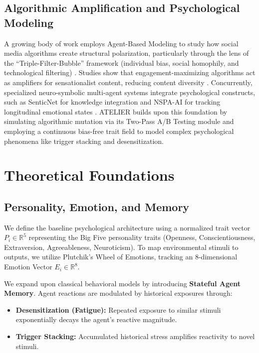 \documentclass[12pt]{IEEEtran}
\begin{document}
\subsection{Algorithmic Amplification and Psychological Modeling}
A growing body of work employs Agent-Based Modeling to study how social media algorithms create structural polarization, particularly through the lens of the ``Triple-Filter-Bubble'' framework (individual bias, social homophily, and technological filtering) \cite{zhao2024triple}. Studies show that engagement-maximizing algorithms act as amplifiers for sensationalist content, reducing content diversity \cite{cinelli2021echo}. Concurrently, specialized neuro-symbolic multi-agent systems integrate psychological constructs, such as SenticNet for knowledge integration and NSPA-AI for tracking longitudinal emotional states \cite{cambria2022senticnet, chen2024nspa}. ATELIER builds upon this foundation by simulating algorithmic mutation via its Two-Pass A/B Testing module and employing a continuous bias-free trait field to model complex psychological phenomena like trigger stacking and desensitization.

\section{Theoretical Foundations}
\label{sec:theoretical_foundations}

\subsection{Personality, Emotion, and Memory}
We define the baseline psychological architecture using a normalized trait vector $P_i \in \mathbb{R}^5$ representing the Big Five personality traits (Openness, Conscientiousness, Extraversion, Agreeableness, Neuroticism). To map environmental stimuli to outputs, we utilize Plutchik's Wheel of Emotions, tracking an 8-dimensional Emotion Vector $E_i \in \mathbb{R}^8$.

We expand upon classical behavioral models by introducing \textbf{Stateful Agent Memory}. Agent reactions are modulated by historical exposures through:
\begin{itemize}
    \item \textbf{Desensitization (Fatigue):} Repeated exposure to similar stimuli exponentially decays the agent's reactive magnitude.
    \item \textbf{Trigger Stacking:} Accumulated historical stress amplifies reactivity to novel stimuli.
\end{itemize}
\end{document}
